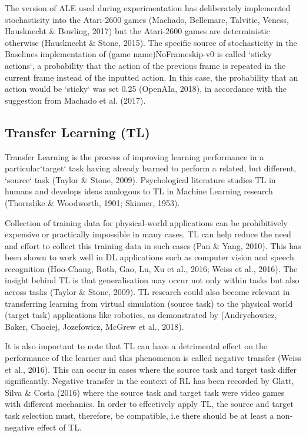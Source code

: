 The version of ALE used during experimentation has deliberately implemented stochasticity into the Atari-2600 games (Machado, Bellemare, Talvitie, Veness, Hausknecht \& Bowling, 2017) but the Atari-2600 games are deterministic otherwise (Hausknecht \& Stone, 2015). The specific source of stochasticity in the Baselines implementation of (game name)NoFrameskip-v0 is called `sticky actions`, a probability that the action of the previous frame is repeated in the current frame instead of the inputted action. In this case, the probability that an action would be `sticky` was set 0.25 (OpenAIa, 2018), in accordance with the suggestion from Machado et al. (2017).

\subsection*{Transfer Learning (TL)}
Transfer Learning is the process of improving learning performance in a particular`target` task having already learned to perform a related, but different, `source` task (Taylor \& Stone, 2009). Psychological literature studies TL in humans and develops ideas analogous to TL in Machine Learning research (Thorndike \& Woodworth, 1901; Skinner, 1953).

Collection of training data for physical-world applications can be prohibitively expensive or practically impossible in many cases. TL can help reduce the need and effort to collect this training data in such cases (Pan \& Yang, 2010). This has been shown to work well in DL applications such as computer vision and speech recognition (Hoo-Chang, Roth, Gao, Lu, Xu et al., 2016; Weiss et al., 2016). The insight behind TL is that generalisation may occur not only within tasks but also across tasks (Taylor \& Stone, 2009). TL research could also become relevant in transferring learning from virtual simulation (source task) to the physical world (target task) applications like robotics, as demonstrated by (Andrychowicz, Baker, Chociej, Jozefowicz, McGrew et al., 2018). 

It is also important to note that TL can have a detrimental effect on the performance of the learner and this phenomenon is called negative transfer (Weiss et al., 2016). This can occur in cases where the source task and target task differ significantly. Negative transfer in the context of RL has been recorded by Glatt, Silva \& Costa (2016) where the source task and target task were video games with different mechanics. In order to effectively apply TL, the source and target task selection must, therefore, be compatible, i.e there should be at least a non-negative effect of TL. 


